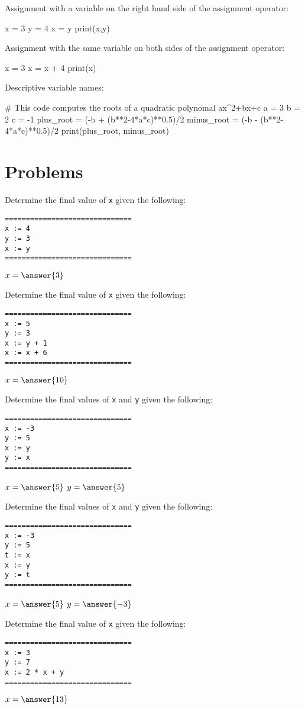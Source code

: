 \documentclass{ximera}
\begin{document}
Assignment with a variable on the right hand side of the assignment operator:

\begin{sageCell}
x = 3
y = 4
x = y
print(x,y)
\end{sageCell}

Assignment with the same variable on both sides of the assignment operator:

\begin{sageCell}
x = 3
x = x + 4
print(x)
\end{sageCell}

Descriptive variable names:

\begin{sageCell}
# This code computes the roots of a quadratic polynomal ax^2+bx+c
a = 3
b = 2
c = -1
plus_root = (-b + (b**2-4*a*c)**0.5)/2
minus_root = (-b - (b**2-4*a*c)**0.5)/2
print(plus_root, minus_root)
\end{sageCell}

\section{Problems}

\begin{question}
	Determine the final value of \verb|x| given the following:
	\begin{verbatim}
==============================
x := 4
y := 3
x := y
==============================
	\end{verbatim}
	$x = \answer{3}$
\end{question}

\begin{question}
	Determine the final value of \verb|x| given the following:
	\begin{verbatim}
==============================
x := 5
y := 3
x := y + 1
x := x + 6
==============================
	\end{verbatim}   
	$x = \answer{10}$
\end{question}

\begin{question}
	Determine the final values of \verb|x| and \verb|y| given the following:
	\begin{verbatim}
==============================
x := -3
y := 5
x := y
y := x
==============================
	\end{verbatim}
	$x = \answer{5}$
	$y = \answer{5}$
\end{question}

\begin{question}
	Determine the final values of \verb|x| and \verb|y| given the following:
	\begin{verbatim}
==============================
x := -3
y := 5
t := x
x := y
y := t
==============================
	\end{verbatim}
	$x = \answer{5}$
	$y = \answer{-3}$
\end{question}

\begin{question}
	Determine the final value of \verb|x| given the following:
	\begin{verbatim}
==============================
x := 3
y := 7
x := 2 * x + y
==============================
	\end{verbatim}
	$x = \answer{13}$
\end{question}
\end{document}
